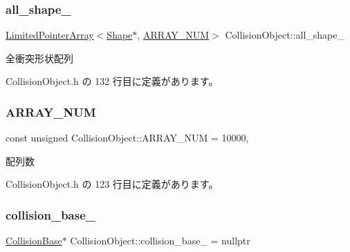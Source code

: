 \subsubsection{\texorpdfstring{all\+\_\+shape\+\_\+}{all\_shape\_}}
{\footnotesize\ttfamily \mbox{\hyperlink{class_limited_pointer_array}{Limited\+Pointer\+Array}}$<$\mbox{\hyperlink{class_collision_object_1_1_shape}{Shape}}$\ast$, \mbox{\hyperlink{class_collision_object_a71cbd23c3332b3833d35efd69928804d}{A\+R\+R\+A\+Y\+\_\+\+N\+UM}}$>$ Collision\+Object\+::all\+\_\+shape\+\_\+\hspace{0.3cm}{\ttfamily [private]}}



全衝突形状配列 



 Collision\+Object.\+h の 132 行目に定義があります。

\mbox{\label{class_collision_object_a71cbd23c3332b3833d35efd69928804d}} 
\subsubsection{\texorpdfstring{A\+R\+R\+A\+Y\+\_\+\+N\+UM}{ARRAY\_NUM}}
{\footnotesize\ttfamily const unsigned Collision\+Object\+::\+A\+R\+R\+A\+Y\+\_\+\+N\+UM = 10000\hspace{0.3cm}{\ttfamily [static]}, {\ttfamily [private]}}



配列数 



 Collision\+Object.\+h の 123 行目に定義があります。

\mbox{\label{class_collision_object_a1d78432ab67e6554356ac9882f421501}} 
\subsubsection{\texorpdfstring{collision\+\_\+base\+\_\+}{collision\_base\_}}
{\footnotesize\ttfamily \mbox{\hyperlink{class_collision_base}{Collision\+Base}}$\ast$ Collision\+Object\+::collision\+\_\+base\+\_\+ = nullptr\hspace{0.3cm}{\ttfamily [private]}}



